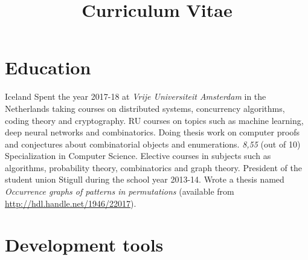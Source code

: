 \documentclass[11pt,a4paper,sans]{moderncv}
\title{Curriculum Vitae}
\begin{document}
\makecvtitle

\section{Education}
{Iceland}{} {Spent the year 2017-18 at \emph{Vrije Universiteit Amsterdam} in the
Netherlands taking courses on distributed systems, concurrency algorithms, coding 
theory and cryptography. RU courses on topics such as machine learning, deep 
neural networks and combinatorics. Doing thesis work on computer proofs and 
conjectures about combinatorial objects and enumerations.}
{\textit{8,55} (out of 10)} {Specialization in Computer Science. Elective courses
in subjects such as algorithms, probability theory, combinatorics and graph theory.
President of the student union Stigull during the school year 2013-14. Wrote a
thesis named \emph{Occurrence graphs of patterns in permutations} (available from
\url{http://hdl.handle.net/1946/22017}).}



\section{Development tools}
\end{document}
